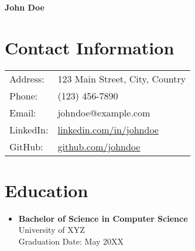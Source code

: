 \documentclass[a4paper,10pt]{article}
\begin{document}
\pagestyle{empty}

\begin{center}
    \textbf{\LARGE John Doe}
\end{center}

\section*{Contact Information}
\begin{tabular}{l l}
    Address: & 123 Main Street, City, Country \\
    Phone: & (123) 456-7890 \\
    Email: & johndoe@example.com \\
    LinkedIn: & \href{https://www.linkedin.com/in/johndoe}{linkedin.com/in/johndoe} \\
    GitHub: & \href{https://github.com/johndoe}{github.com/johndoe}
\end{tabular}

\section*{Education}
\begin{itemize}[leftmargin=*]
    \item \textbf{Bachelor of Science in Computer Science} \\
    University of XYZ \\
    Graduation Date: May 20XX
\end{itemize}
\end{document}
